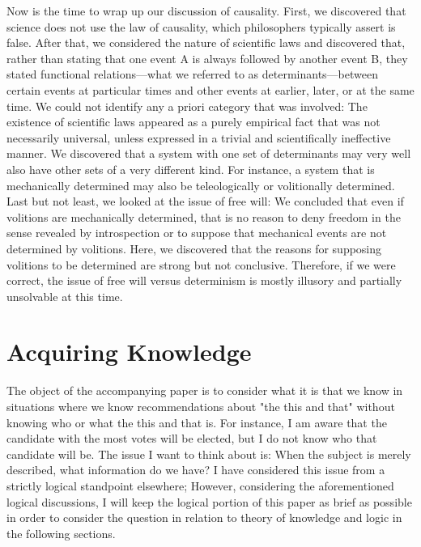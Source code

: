 \documentclass[a4paper,12pt]{book}[2004/02/16]
\theoremstyle{ilemma}
\theoremstyle{itheorem}
\theoremstyle{iother}
\theoremstyle{icorollary}
\theoremstyle{numcorollary}
\theoremstyle{idefinition}
\begin{document}
Now is the time to wrap up our discussion of causality. First, we discovered that science does not use the law of causality, which philosophers typically assert is false. After that, we considered the nature of scientific laws and discovered that, rather than stating that one event A is always followed by another event B, they stated functional relations—what we referred to as determinants—between certain events at particular times and other events at earlier, later, or at the same time. We could not identify any a priori category that was involved: The existence of scientific laws appeared as a purely empirical fact that was not necessarily universal, unless expressed in a trivial and scientifically ineffective manner. We discovered that a system with one set of determinants may very well also have other sets of a very different kind. For instance, a system that is mechanically determined may also be teleologically or volitionally determined. Last but not least, we looked at the issue of free will: We concluded that even if volitions are mechanically determined, that is no reason to deny freedom in the sense revealed by introspection or to suppose that mechanical events are not determined by volitions. Here, we discovered that the reasons for supposing volitions to be determined are strong but not conclusive. Therefore, if we were correct, the issue of free will versus determinism is mostly illusory and partially unsolvable at this time.
\chapter{Acquiring Knowledge}
The object of the accompanying paper is to consider what it is that we
know in situations where we know recommendations about "the this and that" without
knowing who or what the this and that is. For instance, I am aware that the candidate with the most votes will be elected, but I do not know who that candidate will be. The issue I want to think about is: When the subject is merely described, what information do we have? I have considered this issue from a strictly logical standpoint elsewhere; However, considering the aforementioned logical discussions, I will keep the logical portion of this paper as brief as possible in order to consider the question in relation to theory of knowledge and logic in the following sections.
\end{document}
